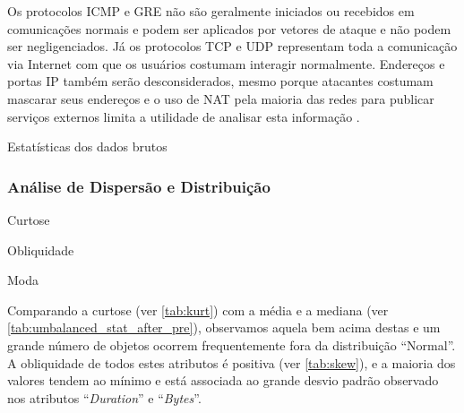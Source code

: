 \documentclass[twoside]{article}
\begin{document}
Os protocolos \gls{ICMP} \cite{postel1981ietf} e \gls{GRE} \cite{farinacci2000rfc2784} não são geralmente iniciados ou recebidos em comunicações normais e podem ser aplicados por vetores de ataque e não podem ser negligenciados. Já os protocolos \gls{TCP} \cite{postel1981transmission} e \gls{UDP} \cite{protocol1980rfc} representam toda a comunicação via Internet com que os usuários costumam interagir normalmente. Endereços e portas \gls{IP} também serão desconsiderados, mesmo porque atacantes costumam mascarar seus endereços e o uso de \gls{NAT} pela maioria das redes para publicar serviços externos limita a utilidade de analisar esta informação \cite{deabordagem}.

\begin{table}\scriptsize
    \centering
    
    \caption{Estatísticas dos dados brutos}
    \label{tab:val_stat_before_pre}
\normalsize\end{table}  

\subsubsection{Análise de Dispersão e Distribuição}

\begin{table}\scriptsize
    \centering
    
    \caption{Curtose}
    \label{tab:kurt}
\normalsize\end{table}  

\begin{table}\scriptsize
    \centering
    
    \caption{Obliquidade}
    \label{tab:skew}
\normalsize\end{table}  

\begin{table}\scriptsize
    \centering
    
    \caption{Moda}
    \label{tab:mode}
\normalsize\end{table}  

Comparando a curtose (ver \cref{tab:kurt}) com a média e a mediana (ver \cref{tab:umbalanced_stat_after_pre}), observamos aquela bem acima destas e um grande número de objetos ocorrem frequentemente fora da distribuição ``Normal''. A obliquidade de todos estes atributos é positiva (ver \cref{tab:skew}), e a maioria dos valores tendem ao mínimo e está associada ao grande desvio padrão observado nos atributos ``\textit{Duration}'' e ``\textit{Bytes}''.
\end{document}

